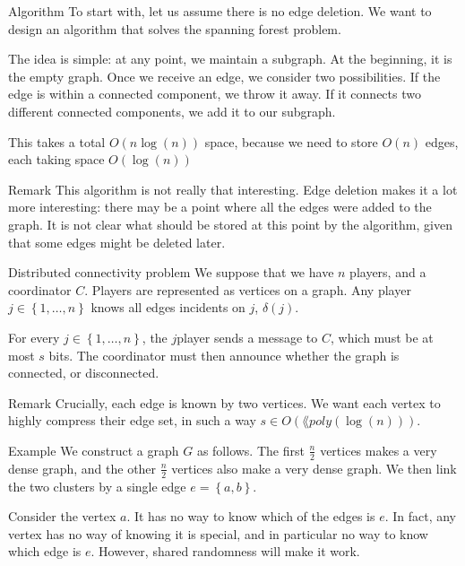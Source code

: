 \documentclass[a4paper]{article}
\begin{document}
\begin{parag}{Algorithm}
    To start with, let us assume there is no edge deletion. We want to design an algorithm that solves the spanning forest problem.
    
    The idea is simple: at any point, we maintain a subgraph. At the beginning, it is the empty graph. Once we receive an edge, we consider two possibilities. If the edge is within a connected component, we throw it away. If it connects two different connected components, we add it to our subgraph.

    This takes a total $O\left(n \log\left(n\right)\right)$ space, because we need to store $O\left(n\right)$ edges, each taking space $O\left(\log\left(n\right)\right)$ 

    \begin{subparag}{Remark}
        This algorithm is not really that interesting. Edge deletion makes it a lot more interesting: there may be a point where all the edges were added to the graph. It is not clear what should be stored at this point by the algorithm, given that some edges might be deleted later.  
    \end{subparag}
\end{parag}

\begin{parag}{Distributed connectivity problem}
    We suppose that we have $n$ players, and a coordinator $C$. Players are represented as vertices on a graph. Any player $j \in \left\{1, \ldots, n\right\}$ knows all edges incidents on $j$, $\delta\left(j\right)$. 

    For every $j \in \left\{1, \ldots, n\right\}$, the $j$\Th player sends a message to $C$, which must be at most $s$ bits. The coordinator must then announce whether the graph is connected, or disconnected.

    \begin{subparag}{Remark}
        Crucially, each edge is known by two vertices. We want each vertex to highly compress their edge set, in such a way $s \in O\left(\lang{poly}\left(\log\left(n\right)\right)\right)$.
    \end{subparag}

    \begin{subparag}{Example}
        We construct a graph $G$ as follows. The first $\frac{n}{2}$ vertices makes a very dense graph, and the other $\frac{n}{2}$ vertices also make a very dense graph. We then link the two clusters by a single edge $e = \left\{a, b\right\}$.

        Consider the vertex $a$. It has no way to know which of the edges is $e$. In fact, any vertex has no way of knowing it is special, and in particular no way to know which edge is $e$. However, shared randomness will make it work.
    \end{subparag}
\end{parag}
\end{document}

